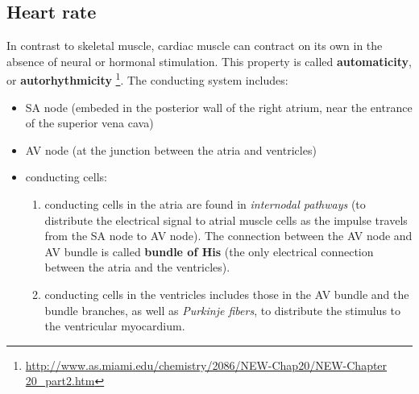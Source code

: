 
% 
% 
% 


\subsection{Heart rate}

In contrast to skeletal muscle, cardiac muscle can contract on its own in the
absence of neural or hormonal stimulation. This property is called {\bf
automaticity}, or {\bf autorhythmicity}
\footnote{\url{http://www.as.miami.edu/chemistry/2086/NEW-Chap20/NEW-Chapter
20_part2.htm}}. The conducting system includes:
\begin{itemize}
  \item SA node (embeded in the posterior wall of the right atrium, near the
  entrance of the superior vena cava)
  \item AV node (at the junction between the atria and ventricles)
  \item conducting cells: 
\begin{enumerate}
  \item  conducting cells in the atria are found in {\it
  internodal pathways} (to distribute the electrical signal to atrial muscle
  cells as the impulse travels from the SA node to AV node). The connection between the AV node and
  AV bundle is called {\bf bundle of His} (the only electrical connection
  between the atria and the ventricles).
  \item conducting cells in the ventricles includes those in the AV bundle and
  the bundle branches, as well as {\it Purkinje fibers}, to distribute the
  stimulus to the ventricular myocardium. 
\end{enumerate}
\end{itemize}

